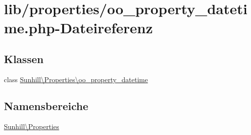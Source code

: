 \hypertarget{oo__property__datetime_8php}{}\section{lib/properties/oo\+\_\+property\+\_\+datetime.php-\/\+Dateireferenz}
\label{oo__property__datetime_8php}
\subsection*{Klassen}
\begin{DoxyCompactItemize}
\item 
class \hyperlink{classSunhill_1_1Properties_1_1oo__property__datetime}{Sunhill\textbackslash{}\+Properties\textbackslash{}oo\+\_\+property\+\_\+datetime}
\end{DoxyCompactItemize}
\subsection*{Namensbereiche}
\begin{DoxyCompactItemize}
\item 
 \hyperlink{namespaceSunhill_1_1Properties}{Sunhill\textbackslash{}\+Properties}
\end{DoxyCompactItemize}
